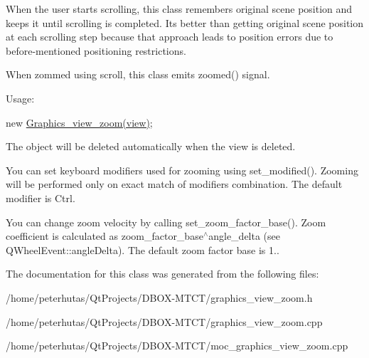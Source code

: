 When the user starts scrolling, this class remembers original scene position and keeps it until scrolling is completed. It\textquotesingle{}s better than getting original scene position at each scrolling step because that approach leads to position errors due to before-\/mentioned positioning restrictions.

When zommed using scroll, this class emits zoomed() signal.

Usage\+:

new \mbox{\hyperlink{class_graphics__view__zoom}{Graphics\+\_\+view\+\_\+zoom(view)}};

The object will be deleted automatically when the view is deleted.

You can set keyboard modifiers used for zooming using set\+\_\+modified(). Zooming will be performed only on exact match of modifiers combination. The default modifier is Ctrl.

You can change zoom velocity by calling set\+\_\+zoom\+\_\+factor\+\_\+base(). Zoom coefficient is calculated as zoom\+\_\+factor\+\_\+base$^\wedge$angle\+\_\+delta (see Q\+Wheel\+Event\+::angle\+Delta). The default zoom factor base is 1.. 

The documentation for this class was generated from the following files\+:\begin{DoxyCompactItemize}
\item 
/home/peterhutas/\+Qt\+Projects/\+D\+B\+O\+X-\/\+M\+T\+C\+T/graphics\+\_\+view\+\_\+zoom.\+h\item 
/home/peterhutas/\+Qt\+Projects/\+D\+B\+O\+X-\/\+M\+T\+C\+T/graphics\+\_\+view\+\_\+zoom.\+cpp\item 
/home/peterhutas/\+Qt\+Projects/\+D\+B\+O\+X-\/\+M\+T\+C\+T/moc\+\_\+graphics\+\_\+view\+\_\+zoom.\+cpp\end{DoxyCompactItemize}
